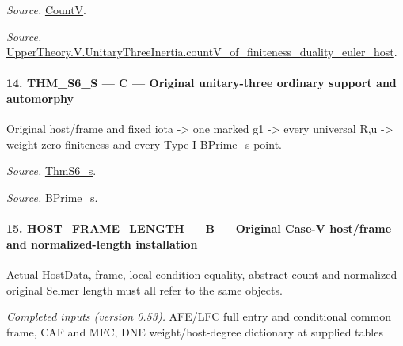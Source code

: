 \emph{Source.} \href{https://github.com/CocoSgt/riemann-hypothesis-lean/blob/7cbf7a0c32fca1badf05931879a37c3f8a2b03b4/src/Development/AutomorphicArithmetic/AutomorphicVarieties/HeightAndVanishing/Counts.lean#L69-L69}{CountV}.

\emph{Source.} \href{https://github.com/CocoSgt/riemann-hypothesis-lean/blob/7cbf7a0c32fca1badf05931879a37c3f8a2b03b4/src/Development/AutomorphicArithmetic/AutomorphicVarieties/ModularityArgument/ThresholdArguments/DenseThresholdCases/CountVOf.lean#L33-L60}{UpperTheory.V.UnitaryThreeInertia.countV\_\allowbreak of\_\allowbreak finiteness\_\allowbreak duality\_\allowbreak euler\_\allowbreak host}.



\paragraph{14. THM\_\allowbreak S6\_\allowbreak S — C — Original unitary-three ordinary support and automorphy}

Original host/frame and fixed iota -> one marked g1 -> every universal R,u -> weight-zero finiteness and every Type-I BPrime\_\allowbreak s point.

\emph{Source.} \href{https://github.com/CocoSgt/riemann-hypothesis-lean/blob/7cbf7a0c32fca1badf05931879a37c3f8a2b03b4/src/Development/AutomorphicArithmetic/AutomorphicVarieties/ModularityArgument/ThresholdArguments/DenseThresholdCases/ThmS6CoreS.lean#L17-L26}{ThmS6\_\allowbreak s}.

\emph{Source.} \href{https://github.com/CocoSgt/riemann-hypothesis-lean/blob/7cbf7a0c32fca1badf05931879a37c3f8a2b03b4/src/Development/AutomorphicArithmetic/AutomorphicVarieties/ModularityArgument/ThresholdArguments/DenseThresholdCases/ThmS6CoreS.lean#L12-L16}{BPrime\_\allowbreak s}.



\paragraph{15. HOST\_\allowbreak FRAME\_\allowbreak LENGTH — B — Original Case-V host/frame and normalized-length installation}

Actual HostData, frame, local-condition equality, abstract count and normalized original Selmer length must all refer to the same objects.

\emph{Completed inputs (version 0.53).} AFE/LFC full entry and conditional common frame, CAF and MFC, DNE weight/host-degree dictionary at supplied tables

